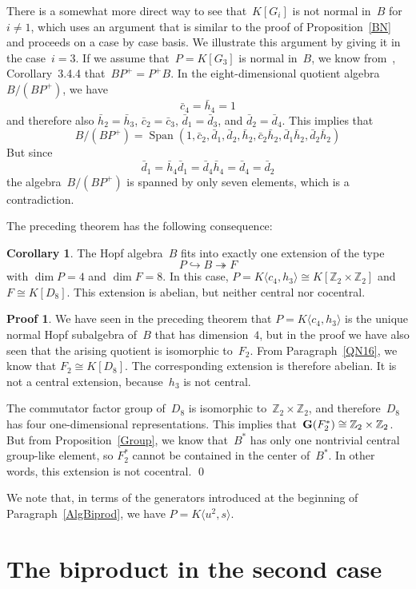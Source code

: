 \documentclass{article}
\numberwithin{equation}{section}
\theoremstyle{definition}
\newtheorem*{cor}{Corollary}
\newtheorem*{pf}{Proof}
\theoremstyle{break}
\newcommand{\dm}{\operatorname{dim}}
\newcommand{\Span}{\operatorname{Span}}
\newcommand{\1}{{(1)}}
\newcommand{\2}{{(2)}}
\newcommand{\3}{{(3)}}
\newcommand{\Z}{{\mathbb Z}}
\begin{document}
There is a somewhat more direct way to see that~$K[G_i]$ is not normal in~$B$ for~$i \neq 1$, which uses an argument that is similar to the proof of Proposition~\ref{BN} and proceeds on a case by case basis. We illustrate this argument by giving it in the case~$i=3$. If we assume that~$P=K[G_3]$ is normal in~$B$, we know from~\cite{M}, Corollary~3.4.4 that~$BP^+= P^+B$. In the eight-dimensional quotient algebra~$B/(BP^+)$, we have 
\[\bar{c}_4 = \bar{h}_4 = 1\]
and therefore also $\bar{h}_2 = \bar{h}_3$, $\bar{c}_2 = \bar{c}_3$, $\bar{d}_1 = \bar{d}_3$, and $\bar{d}_2 = \bar{d}_4$.
This implies that
\[B/(BP^+) = \Span(1, \bar{c}_2, \bar{d}_1, \bar{d}_2, \bar{h}_2, \bar{c}_2 \bar{h}_2, \bar{d}_1\bar{h}_2, \bar{d}_2 \bar{h}_2)\]
But since
\[\bar{d}_1 = \bar{h}_4 \bar{d}_1 = \bar{d}_4 \bar{h}_4 = \bar{d}_4 = \bar{d}_2\]
the algebra~$B/(BP^+)$ is spanned by only seven elements, which is a contradiction.

The preceding theorem has the following consequence:
\begin{cor}
The Hopf algebra~$B$ fits into exactly one extension of the type
\[P \hookrightarrow B \twoheadrightarrow F \]
with $\dm P = 4$ and $\dm F =8 $. In this case, $P = K \langle c_4, h_3 \rangle \cong K[\Z_2\times \Z_2]$ and $F \cong K[D_8]$. This extension is abelian, but neither central nor cocentral.
\end{cor}
\begin{pf}
We have seen in the preceding theorem that $P = K \langle c_4, h_3 \rangle$ is the unique normal Hopf subalgebra of~$B$ that has dimension~$4$, but in the proof we have also seen that the arising quotient is isomorphic to~$F_2$. From Paragraph~\ref{QN16}, we know that
$F_2 \cong K[D_8]$. The corresponding extension is therefore abelian. It is not a central extension, because~$h_3$ is not central.

The commutator factor group of~$D_8$ is isomorphic to~$\Z_2 \times \Z_2$, and therefore~$D_8$ has four one-dimensional representations. This implies
that~${\bf G}(F_2^*) \cong \Z_2 \times \Z_2$. But from Proposition~\ref{Group}, we know that~$B^*$ has only one nontrivial central group-like element, so $F_2^*$ cannot be contained in the center of~$B^*$. In other words, this extension is not cocentral.
\qed
\end{pf}

We note that, in terms of the generators introduced at the beginning of Paragraph~\ref{AlgBiprod}, we have $P = K \langle u^2, s \rangle$.


\section{The biproduct in the second case} \label{Sec:BiprodSec}
\end{document}
